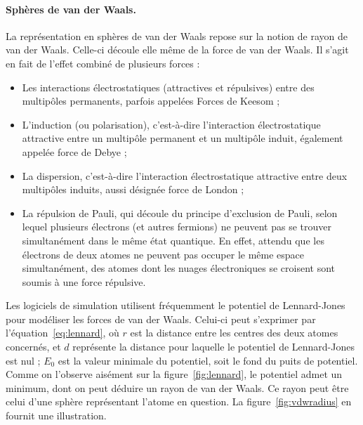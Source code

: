 	\paragraph{Sphères de van der Waals.} La représentation en sphères de van der Waals repose sur la notion de rayon de van der Waals. Celle-ci découle elle même de la force de van der Waals. Il s'agit en fait de l'effet combiné de plusieurs forces :
	
	\begin{itemize}
	    \item Les interactions électrostatiques (attractives et répulsives) entre des multipôles permanents, parfois appelées Forces de Keesom ;
		\item L'induction (ou polarisation), c'est-à-dire l'interaction électrostatique attractive entre un multipôle permanent et un multipôle induit, également appelée force de Debye ;
	    \item La dispersion, c'est-à-dire l'interaction électrostatique attractive entre deux multipôles induits, aussi désignée force de London ;
		\item La répulsion de Pauli, qui découle du principe d'exclusion de Pauli, selon lequel plusieurs électrons (et autres fermions) ne peuvent pas se trouver simultanément dans le même état quantique. En effet, attendu que les électrons de deux atomes ne peuvent pas occuper le même espace simultanément, des atomes dont les nuages électroniques se croisent sont soumis à une force répulsive.
	\end{itemize}
	
	Les logiciels de simulation utilisent fréquemment le potentiel de Lennard-Jones~\cite{lennard1924determination} pour modéliser les forces de van der Waals. Celui-ci peut s'exprimer par l'équation~\ref{eq:lennard}, où $r$ est la distance entre les centres des deux atomes concernés, et $d$ représente la distance pour laquelle le potentiel de Lennard-Jones est nul ; $E_{0}$ est la valeur minimale du potentiel, soit le \og fond \fg{} du puits de potentiel. Comme on l'observe aisément sur la figure~\ref{fig:lennard}, le potentiel admet un minimum, dont on peut déduire un rayon de van der Waals. Ce rayon peut être celui d'une sphère représentant l'atome en question. La figure~\ref{fig:vdwradius} en fournit une illustration.
		
